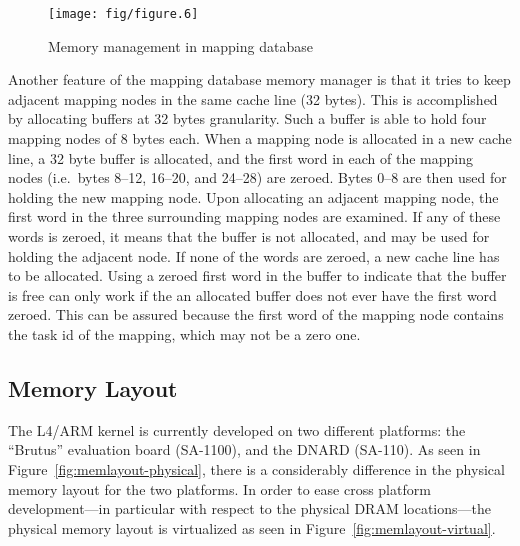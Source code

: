 \documentclass[a4paper,10pt,twoside]{article}
\begin{document}
\begin{figure}[tbp]
  \begin{center}
    \texttt{[image: fig/figure.6]}
    \caption{Memory management in mapping database}
    \label{fig:mdb-mem}
  \end{center}
\end{figure}

Another feature of the mapping database memory manager is that it
tries to keep adjacent mapping nodes in the same cache line (32
bytes).  This is accomplished by allocating buffers at 32 bytes
granularity.  Such a buffer is able to hold four mapping nodes of 8
bytes each.  When a mapping node is allocated in a new cache line, a
32 byte buffer is allocated, and the first word in each of the mapping
nodes (i.e.\ bytes 8--12, 16--20, and 24--28) are zeroed.  Bytes 0--8
are then used for holding the new mapping node.  Upon allocating an
adjacent mapping node, the first word in the three surrounding mapping
nodes are examined.  If any of these words is zeroed, it means that
the buffer is not allocated, and may be used for holding the adjacent
node.  If none of the words are zeroed, a new cache line has to be
allocated.  Using a zeroed first word in the buffer to indicate that
the buffer is free can only work if the an allocated buffer does not
ever have the first word zeroed.  This can be assured because the
first word of the mapping node contains the task id of the mapping,
which may not be a zero one.


\subsection{Memory Layout}

The L4/ARM kernel is currently developed on two different platforms:
the ``Brutus'' evaluation board (SA-1100), and the DNARD (SA-110).  As
seen in Figure~\ref{fig:memlayout-physical}, there is a considerably
difference in the physical memory layout for the two platforms.  In
order to ease cross platform development---in particular with respect
to the physical DRAM locations---the physical memory layout is
virtualized as seen in Figure~\ref{fig:memlayout-virtual}.
\end{document}
